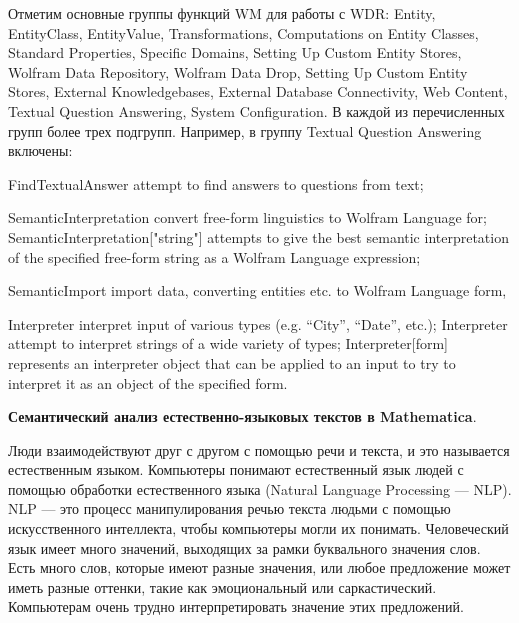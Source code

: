 Отметим основные группы функций WM для работы с WDR: 
Entity, EntityClass, EntityValue, Transformations, Computations on Entity Classes, Standard Properties, Specific Domains, Setting Up Custom Entity Stores, Wolfram Data Repository, Wolfram Data Drop, Setting Up Custom Entity Stores, External Knowledgebases, External Database Connectivity, Web Content, Textual Question Answering, System Configuration. 
В каждой из перечисленных групп более трех подгрупп. Например, в группу Textual Question Answering включены: 
\begin{textitemize}
	\item FindTextualAnswer attempt to find answers to questions from text;
	\item SemanticInterpretation convert free-form linguistics to Wolfram Language for; SemanticInterpretation["string"] attempts to give the best semantic interpretation of the specified free-form string as a Wolfram Language expression; 
	\item SemanticImport import data, converting entities etc. to Wolfram Language form, 
	\item Interpreter interpret input of various types (e.g. ``City'', ``Date'', etc.); Interpreter attempt to interpret strings of a wide variety of types; Interpreter[form] represents an interpreter object that can be applied to an input to try to interpret it as an object of the specified form.
\end{textitemize}

\textbf{Семантический анализ естественно-языковых текстов в Mathematica}. 

Люди взаимодействуют друг с другом с помощью речи и текста, и это называется естественным языком. Компьютеры понимают естественный язык людей с помощью обработки естественного языка (Natural Language Processing --- NLP).
NLP --- это процесс манипулирования речью текста людьми с помощью искусственного интеллекта, чтобы компьютеры могли их понимать. 
Человеческий язык имеет много значений, выходящих за рамки буквального значения слов. Есть много слов, которые имеют разные значения, или любое предложение может иметь разные оттенки, такие как эмоциональный или саркастический. Компьютерам очень трудно интерпретировать значение этих предложений. 

